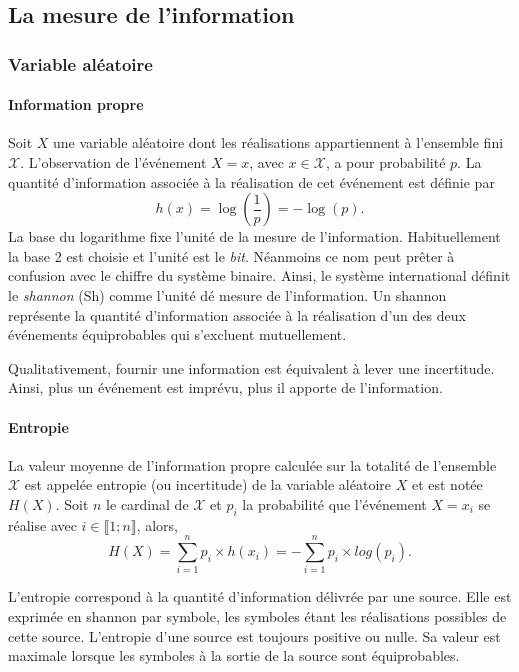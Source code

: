 \subsection{La mesure de l'information}
\subsubsection{Variable aléatoire}
\paragraph*{Information propre}
Soit $X$ une variable aléatoire dont les réalisations appartiennent à l'ensemble fini $\mathcal{X}$. L'observation de 
l'événement $X=x$, avec $x\in \mathcal{X}$, a pour probabilité $p$. La quantité d'information associée à la réalisation
de cet événement est définie par \[h(x)=\log(\frac{1}{p})=-\log(p).\]
La base du logarithme fixe l'unité de la mesure de l'information. Habituellement la base 2 est
choisie et l'unité est le \emph{bit}. Néanmoins ce nom peut prêter à confusion avec le chiffre du système binaire. 
Ainsi, le système international \cite{ISO} définit le \emph{shannon} (Sh) comme l'unité dé mesure de l'information. Un shannon 
représente la quantité d’information associée à la réalisation d'un des deux événements équiprobables qui s’excluent 
mutuellement. 

Qualitativement, fournir une information est équivalent à lever une incertitude. Ainsi, plus un événement est imprévu, 
plus il apporte de l'information.

\paragraph*{Entropie}
La valeur moyenne de l'information propre calculée sur la totalité de l'ensemble $\mathcal{X}$ est appelée entropie (ou 
incertitude) de la variable aléatoire $X$ et est notée $H(X)$. Soit $n$ le cardinal de $\mathcal{X}$ et $p_i$ la 
probabilité que l'événement $X=x_i$ se réalise avec $i\in \llbracket 1; n\rrbracket$, alors, 
\[H(X) = \sum\limits_{i=1}^n p_i\times h(x_i) = - \sum\limits_{i=1}^n p_i\times log(p_i).\]

L'entropie correspond à la quantité d'information délivrée par une source. Elle est exprimée en shannon 
par symbole, les symboles étant les réalisations possibles de cette source. L'entropie d'une source est toujours positive
ou nulle. Sa valeur est maximale lorsque les symboles à la sortie de la source sont équiprobables.

